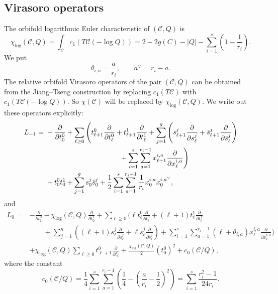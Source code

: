 \documentclass[letterpaper,12pt]{amsart}
\theoremstyle{definition}
\newcommand{\cC}{\mathcal C}
\numberwithin{equation}{section}
\begin{document}
\subsection{Virasoro operators}\label{subsec:virasoro-operators}
The orbifold logarithmic Euler characteristic of $(\cC,Q)$ is
\begin{equation*}
  \chi_{\log}(\cC,Q)
  =\int_{\cC}c_1(T\cC(-\log Q))=2-2g(C)-|Q|-
  \sum_{i=1}^{s}\left(1-\frac1{r_i}\right).
\end{equation*}
We put
\[
\theta_{i,a}=\frac{a}{r_i},
\qquad a^\vee=r_i-a.
\]
The relative orbifold Virasoro operators of the pair $(\cC,Q)$ can be obtained from the Jiang--Tseng construction \cite{JT} by replacing $c_1(T\cC)$ with $c_1(T\cC(-\log Q))$. So $\chi(\cC)$ will be replaced by $\chi_{\log}(\cC,Q)$. We write out these operators explicitly: 
\begin{align*}
L_{-1}={}&-\frac{\partial}{\partial t^0_0}
+\sum_{\ell\ge0}\Bigg(
 t^0_{\ell+1}\frac{\partial}{\partial t^0_\ell}
+t^1_{\ell+1}\frac{\partial}{\partial t^1_\ell}
+\sum_{j=1}^g\left(
 s^j_{\ell+1}\frac{\partial}{\partial s^j_\ell}
+\bar s^j_{\ell+1}\frac{\partial}{\partial \bar s^j_\ell}
\right)\nonumber\\
&\hspace{37mm}
+\sum_{i=1}^s\sum_{a=1}^{r_i-1}
 x^{i,a}_{\ell+1}\frac{\partial}{\partial x^{i,a}_\ell}
\Bigg)\nonumber\\
&+ t^0_0t^1_0
+\sum_{j=1}^g s^j_0\bar s^j_0
+\frac1{2}\sum_{i=1}^s\sum_{a=1}^{r_i-1}
\frac1{r_i}x^{i,a}_0x^{i,a^\vee}_0,
\end{align*}
and 
\begin{align*}
L_0={}&-\frac{\partial}{\partial t^0_1}
-\chi_{\log}(\cC,Q)\frac{\partial}{\partial t^1_0}
+\sum_{\ell\ge0}\Bigg(
\ell t^0_\ell\frac{\partial}{\partial t^0_\ell}
+(\ell+1)t^1_\ell\frac{\partial}{\partial t^1_\ell}\nonumber\\
&\qquad+\sum_{j=1}^g\left(
(\ell+1)s^j_\ell\frac{\partial}{\partial s^j_\ell}
+\ell\bar s^j_\ell\frac{\partial}{\partial \bar s^j_\ell}
\right)
+\sum_{i=1}^s\sum_{a=1}^{r_i-1}
(\ell+\theta_{i,a})x^{i,a}_\ell\frac{\partial}{\partial x^{i,a}_\ell}
\Bigg)\nonumber\\
&+\chi_{\log}(\cC,Q)\sum_{\ell\ge0}
 t^0_{\ell+1}\frac{\partial}{\partial t^1_\ell}
+\frac{\chi_{\log}(\cC,Q)}{2}(t^0_0)^2
+c_0(\mathcal C/Q),
\end{align*}
where the constant
\begin{equation*}
c_0(\mathcal C/Q)
= \frac14\sum_{i=1}^s\sum_{a=1}^{r_i-1}
  \left(\frac14-\left(\frac{a}{r_i}-\frac12\right)^2\right)=\sum_{i=1}^s\frac{r_i^2-1}{24r_i}.
\end{equation*}
\end{document}
